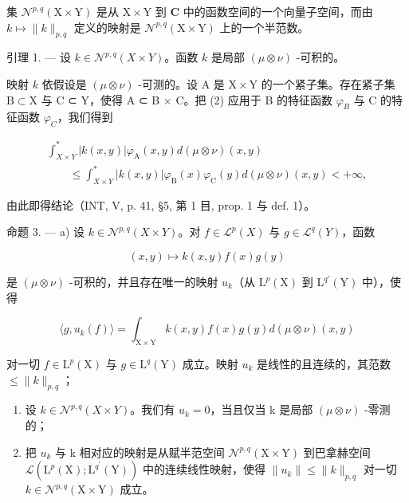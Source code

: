 集 \(\mathcal{N}^{p,q}(\mathrm{X}\times \mathrm{Y})\) 是从 \(\mathrm{X}\times\mathrm{Y}\) 到 \(\mathbf{C}\) 中的函数空间的一个向量子空间，而由 \(k\mapsto \| k\|_{p,q}\) 定义的映射是 \(\mathcal{N}^{p,q}(\mathrm{X}\times \mathrm{Y})\) 上的一个半范数。

引理 1. --- 设 \(k \in \mathcal{N}^{p,q}(X \times Y)\)。函数 \(k\) 是局部 \((\mu \otimes \nu)\) -可积的。

映射 \(k\) 依假设是 \((\mu \otimes \nu)\) -可测的。设 A 是 \(\mathrm{X} \times \mathrm{Y}\) 的一个紧子集。存在紧子集 \(\mathrm{B} \subset \mathrm{X}\) 与 C ⊂ Y，使得 A ⊂ B × C。把 (2) 应用于 B 的特征函数 \(\varphi_{B}\) 与 C 的特征函数 \(\varphi_{C}\)，我们得到

\[
\begin{array}{l} \int_ {X \times Y} ^ {*} | k (x, y) | \varphi_ {\mathrm{A}} (x, y) d (\mu \otimes \nu) (x, y) \\ \qquad \leqslant \int_ {X \times Y} ^ {*} | k (x, y) | \varphi_ {\mathrm{B}} (x) \varphi_ {\mathrm{C}} (y) d (\mu \otimes \nu) (x, y) <   + \infty , \end{array}
\]

由此即得结论（INT, V, p. 41, §5, 第 1 目, prop. 1 与 def. 1）。

命题 3. --- a) 设 \(k \in \mathcal{N}^{p,q}(X \times Y)\)。对 \(f \in \mathcal{L}^p(X)\) 与 \(g \in \mathcal{L}^q(Y)\)，函数

\[
(x, y) \mapsto k (x, y) f (x) g (y)
\]

是 \((\mu \otimes \nu)\) -可积的，并且存在唯一的映射 \(u_{k}\)（从 \(\mathrm{L}^{p}(\mathrm{X})\) 到 \(\mathrm{L}^{q'}(\mathrm{Y})\) 中），使得

\[
\langle g, u _ {k} (f) \rangle = \int_ {\mathrm{X} \times \mathrm{Y}} k (x, y) f (x) g (y) d (\mu \otimes \nu) (x, y)
\]

对一切 \(f \in \mathrm{L}^p(\mathrm{X})\) 与 \(g \in \mathrm{L}^q(\mathrm{Y})\) 成立。映射 \(u_k\) 是线性的且连续的，其范数 \(\leqslant \| k\|_{p,q}\)；

\begin{enumerate}
\def\labelenumi{\alph{enumi})}
\setcounter{enumi}{1}
\item
  设 \(k \in \mathcal{N}^{p,q}(X \times Y)\)。我们有 \(u_k = 0\)，当且仅当 k 是局部 \((\mu \otimes \nu)\) -零测的；
\item
  把 \(u_{k}\) 与 k 相对应的映射是从赋半范空间 \(\mathcal{N}^{p,q}(\mathrm{X}\times\mathrm{Y})\) 到巴拿赫空间 \(\mathcal{L}(\mathrm{L}^{p}(\mathrm{X});\mathrm{L}^{q^{\prime}}(\mathrm{Y}))\) 中的连续线性映射，使得 \(\|u_{k}\|\leqslant\|k\|_{p,q}\) 对一切 \(k\in\mathcal{N}^{p,q}(\mathrm{X}\times\mathrm{Y})\) 成立。
\end{enumerate}

